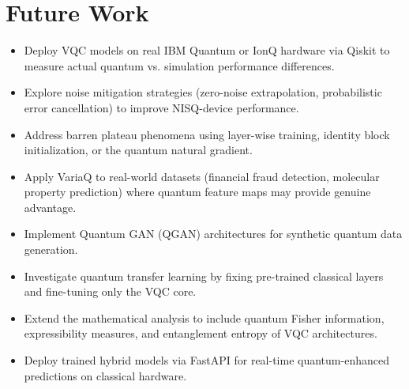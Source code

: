 \documentclass[conference]{IEEEtran}
\begin{document}
\section{Future Work}
\begin{itemize}
  \item Deploy VQC models on real IBM Quantum or IonQ hardware via Qiskit to measure actual quantum vs. simulation performance differences.
  \item Explore noise mitigation strategies (zero-noise extrapolation, probabilistic error cancellation) to improve NISQ-device performance.
  \item Address barren plateau phenomena using layer-wise training, identity block initialization, or the quantum natural gradient.
  \item Apply VariaQ to real-world datasets (financial fraud detection, molecular property prediction) where quantum feature maps may provide genuine advantage.
  \item Implement Quantum GAN (QGAN) architectures for synthetic quantum data generation.
  \item Investigate quantum transfer learning by fixing pre-trained classical layers and fine-tuning only the VQC core.
  \item Extend the mathematical analysis to include quantum Fisher information, expressibility measures, and entanglement entropy of VQC architectures.
  \item Deploy trained hybrid models via FastAPI for real-time quantum-enhanced predictions on classical hardware.
\end{itemize}
\end{document}
